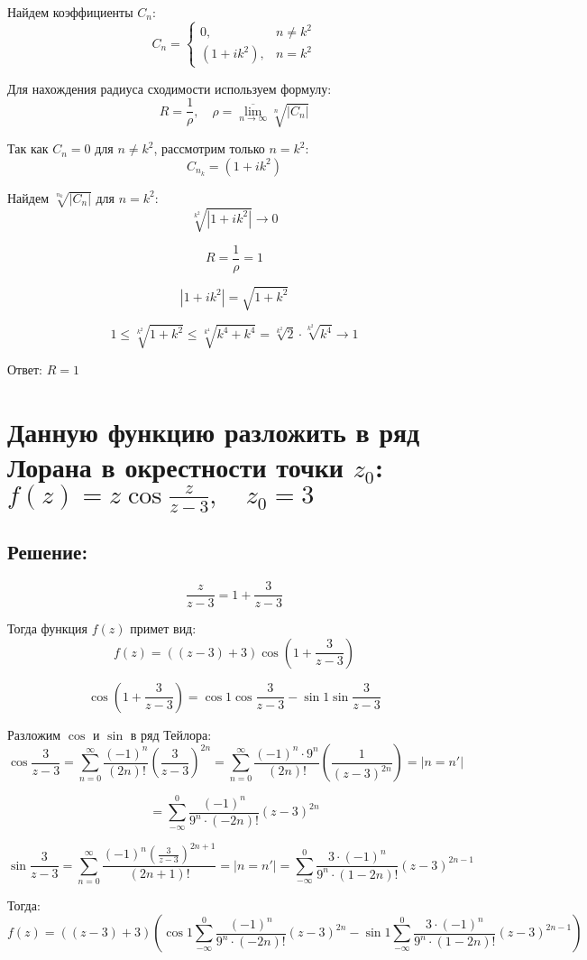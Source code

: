 \documentclass{article}
\begin{document}
Найдем коэффициенты $C_n$:
\[
C_n = 
\begin{cases} 
0, & n \neq k^2 \\
(1 + ik^2), & n = k^2 
\end{cases}
\]

Для нахождения радиуса сходимости используем формулу:
\[
R = \frac{1}{\rho}, \quad \rho = \overline{\lim_{n \to \infty}} \sqrt[n]{|C_n|}
\]

Так как $C_n = 0$ для $n \neq k^2$, рассмотрим только $n = k^2$:
\[
C_{n_k} = (1 + ik^2)
\]

Найдем $\sqrt[n_k]{|C_n|}$ для $n = k^2$:
\[
\sqrt[k^2]{|1 + ik^2|} \rightarrow 0
\]

\[
R = \frac{1}{\rho} = 1
\]

\[
|1 + ik^2| = \sqrt{1 + k^2}
\]

\[
1 \leqslant \sqrt[k^2]{1 + k^2} \leqslant \sqrt[k^4]{k^4 + k^4} = \sqrt[k^2]{2} \cdot \sqrt[k^2]{k^4} \rightarrow 1
\]

Ответ: $R = 1 $


\section{Данную функцию разложить в ряд Лорана в окрестности точки $z_0$: $f(z) = z \cos \frac{z}{z - 3}, \quad z_0 = 3$}
\subsection{Решение:}

\[
\frac{z}{z-3} = 1 + \frac{3}{z-3}
\]

Тогда функция $f(z)$ примет вид:
\[
f(z) = \left((z - 3) + 3\right) \cos \left(1 + \frac{3}{z-3}\right)
\]

\[
\cos \left(1 + \frac{3}{z-3}\right) = \cos 1 \cos \frac{3}{z-3} - \sin 1 \sin \frac{3}{z-3}
\]

Разложим $\cos$ и $\sin$ в ряд Тейлора:
\[
\cos \frac{3}{z-3} = \sum_{n=0}^{\infty} \frac{(-1)^n}{(2n)!} \left(\frac{3}{z-3}\right)^{2n} =  \sum_{n=0}^{\infty} \frac{(-1)^n \cdot 9^n}{(2n)!} \left(\frac{1}{(z-3)^{2n}}\right) = \left|n = n'\right|
\]

\[
= \sum_{-\infty}^{0} \frac{(-1)^n}{9^n \cdot (-2n)!} (z-3)^{2n}
\]

\[
\sin \frac{3}{z-3} = \sum_{n=0}^{\infty} \frac{(-1)^n \left(\frac{3}{z-3}\right)^{2n+1}}{(2n+1)!} = \left|n = n'\right| = \sum_{-\infty}^{0} \frac{3 \cdot (-1)^n}{9^n \cdot (1 - 2n)!} (z-3)^{2n - 1}
\]

Тогда:
\[
f(z) = \left((z - 3) + 3\right) \left(\cos 1 \sum_{-\infty}^{0} \frac{(-1)^n}{9^n \cdot (-2n)!} (z-3)^{2n} - \sin 1 \sum_{-\infty}^{0} \frac{3 \cdot (-1)^n}{9^n \cdot (1 - 2n)!} (z-3)^{2n - 1}\right)
\]
\end{document}
